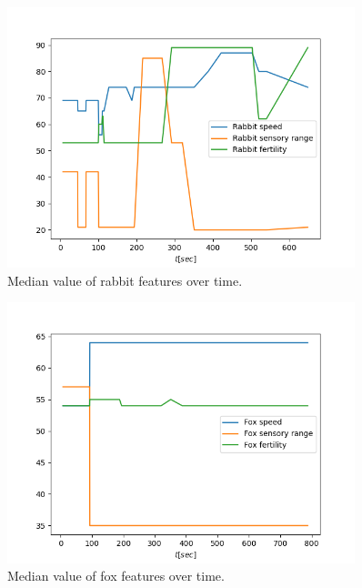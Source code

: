 \begin{figure}[H]
    \centering
    \includegraphics[width=0.9\textwidth]{Images/SimulationResults/Simulation_5_Rabbit speed_Rabbit sensory range_Rabbit fertility.png}
    \caption{Median value of rabbit features over time.}
    \label{fig:simulation3RabbitFeaturesMedian}
\end{figure}

\begin{figure}[H]
    \centering
    \includegraphics[width=0.9\textwidth]{Images/SimulationResults/Simulation_5_Fox speed_Fox sensory range_Fox fertility.png}
    \caption{Median value of fox features over time.}
    \label{fig:simulation3FoxFeaturesMedian}
\end{figure}


